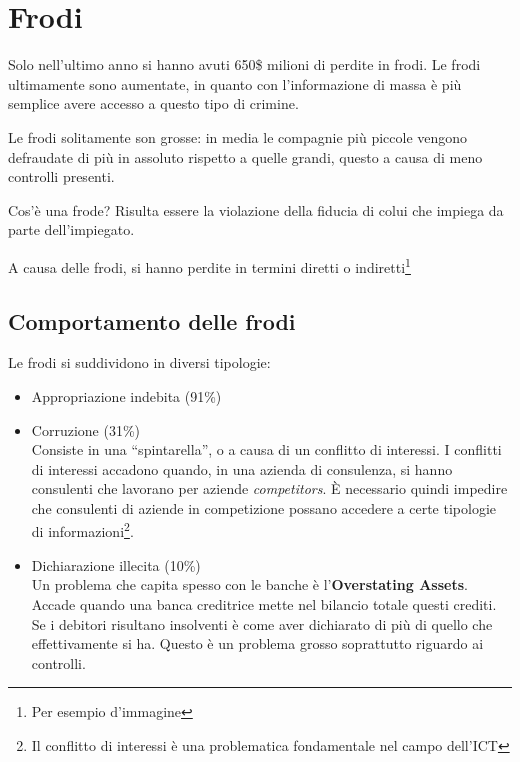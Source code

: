 \chapter{Frodi}
\label{Frodi}

Solo nell'ultimo anno si hanno avuti 650\$ milioni di perdite in frodi. Le frodi
ultimamente sono aumentate, in quanto con l'informazione di massa è più
semplice avere accesso a questo tipo di crimine.

Le frodi solitamente son grosse: in media le compagnie più piccole vengono
defraudate di più in assoluto rispetto a quelle grandi, questo a causa di meno
controlli presenti.

Cos'è una frode? Risulta essere la violazione della fiducia di colui che
impiega da parte dell'impiegato.

A causa delle frodi, si hanno perdite in termini diretti o 
indiretti\footnote{Per esempio d'immagine}

\section{Comportamento delle frodi}

Le frodi si suddividono in diversi tipologie:

\begin{itemize}
  \item Appropriazione indebita (91\%)
  \item Corruzione (31\%) \\
  Consiste in una ``spintarella'', o a causa di un conflitto di interessi. I
  conflitti di interessi accadono quando, in una azienda di consulenza, si
  hanno consulenti che lavorano per aziende \textit{competitors}. È necessario
  quindi impedire che consulenti di aziende in competizione possano accedere a
  certe tipologie di informazioni\footnote{Il conflitto di interessi è una
  problematica fondamentale nel campo dell'ICT}.
  \item Dichiarazione illecita (10\%) \\
  Un problema che capita spesso con le banche è l'\textbf{Overstating Assets}.
  Accade quando una banca creditrice mette nel bilancio totale questi crediti.
  Se i debitori risultano insolventi è come aver dichiarato di più di quello
  che effettivamente si ha. Questo è un problema grosso soprattutto riguardo ai
  controlli.
\end{itemize}
